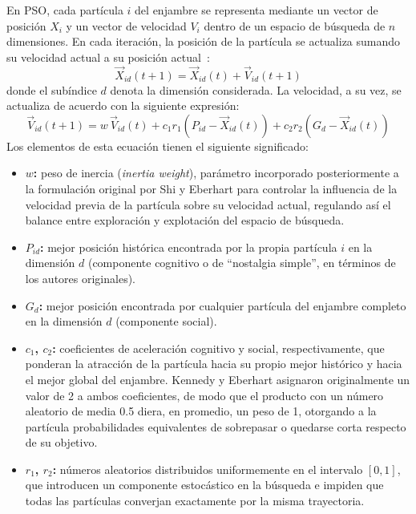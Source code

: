 En PSO, cada partícula $i$ del enjambre se representa mediante un vector de posición $X_i$ y un vector de velocidad $V_i$ dentro de un espacio de búsqueda de $n$ dimensiones. En cada iteración, la posición de la partícula se actualiza sumando su velocidad actual a su posición actual~\cite{nasr_benchmarking_2020}:
\begin{equation}
\vec{X}_{id}(t+1) = \vec{X}_{id}(t) + \vec{V}_{id}(t+1)
\end{equation}
donde el subíndice $d$ denota la dimensión considerada. La velocidad, a su vez, se actualiza de acuerdo con la siguiente expresión:
\begin{equation}
\vec{V}_{id}(t+1) = w\,\vec{V}_{id}(t) + c_1 r_1 \left(P_{id} - \vec{X}_{id}(t)\right) + c_2 r_2 \left(G_d - \vec{X}_{id}(t)\right)
\end{equation}
Los elementos de esta ecuación tienen el siguiente significado:
\begin{itemize}
    \item \textbf{$w$:} peso de inercia (\textit{inertia weight}), parámetro incorporado posteriormente a la formulación original por Shi y Eberhart para controlar la influencia de la velocidad previa de la partícula sobre su velocidad actual, regulando así el balance entre exploración y explotación del espacio de búsqueda.
    \item \textbf{$P_{id}$:} mejor posición histórica encontrada por la propia partícula $i$ en la dimensión $d$ (componente cognitivo o de ``nostalgia simple'', en términos de los autores originales).
    \item \textbf{$G_d$:} mejor posición encontrada por cualquier partícula del enjambre completo en la dimensión $d$ (componente social).
    \item \textbf{$c_1$, $c_2$:} coeficientes de aceleración cognitivo y social, respectivamente, que ponderan la atracción de la partícula hacia su propio mejor histórico y hacia el mejor global del enjambre. Kennedy y Eberhart asignaron originalmente un valor de 2 a ambos coeficientes, de modo que el producto con un número aleatorio de media 0.5 diera, en promedio, un peso de 1, otorgando a la partícula probabilidades equivalentes de sobrepasar o quedarse corta respecto de su objetivo.
    \item \textbf{$r_1$, $r_2$:} números aleatorios distribuidos uniformemente en el intervalo $[0, 1]$, que introducen un componente estocástico en la búsqueda e impiden que todas las partículas converjan exactamente por la misma trayectoria.
\end{itemize}

